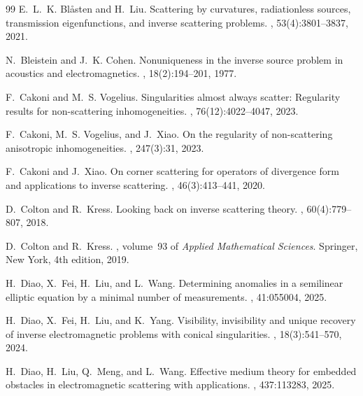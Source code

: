 \documentclass[11pt,reqno,oneside]{amsart}
\theoremstyle{definition}
\theoremstyle{remark}
\numberwithin{equation}{section}
\numberwithin{equation}{section}
\theoremstyle{remark}
\begin{document}
\begin{thebibliography}{99}
	E.~L.~K. Bl{\aa}sten and H.~Liu.
	\newblock Scattering by curvatures, radiationless sources, transmission
	eigenfunctions, and inverse scattering problems.
	, 53(4):3801--3837, 2021.
	
	N.~Bleistein and J.~K. Cohen.
	\newblock Nonuniqueness in the inverse source problem in acoustics and
	electromagnetics.
	, 18(2):194--201, 1977.
	
	F.~Cakoni and M.~S. Vogelius.
	\newblock Singularities almost always scatter: Regularity results for
	non-scattering inhomogeneities.
	,
	76(12):4022--4047, 2023.
	
	F.~Cakoni, M.~S. Vogelius, and J.~Xiao.
	\newblock On the regularity of non-scattering anisotropic inhomogeneities.
	, 247(3):31, 2023.
	
	F.~Cakoni and J.~Xiao.
	\newblock On corner scattering for operators of divergence form and
	applications to inverse scattering.
	,
	46(3):413--441, 2020.
	
	D.~Colton and R.~Kress.
	\newblock Looking back on inverse scattering theory.
	, 60(4):779--807, 2018.
	
	D.~Colton and R.~Kress.
	,
	volume~93 of {\em Applied Mathematical Sciences}.
	\newblock Springer, New York, 4th edition, 2019.
	
	H.~Diao, X.~Fei, H.~Liu, and L.~Wang.
	\newblock Determining anomalies in a semilinear elliptic equation by a minimal
	number of measurements.
	, 41:055004, 2025.
	
	H.~Diao, X.~Fei, H.~Liu, and K.~Yang.
	\newblock Visibility, invisibility and unique recovery of inverse
	electromagnetic problems with conical singularities.
	, 18(3):541--570, 2024.
	
	H.~Diao, H.~Liu, Q.~Meng, and L.~Wang.
	\newblock Effective medium theory for embedded obstacles in electromagnetic
	scattering with applications.
	, 437:113283, 2025.
	

\end{thebibliography}
\end{document}
